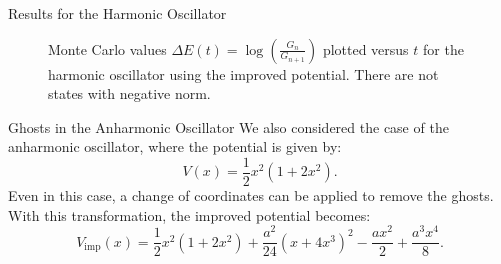 \documentclass{beamer}
\begin{document}
\begin{frame}{Results for the Harmonic Oscillator}
\begin{figure}[ht]
\begin{minipage}[b]{0.4\linewidth}
            \caption{Monte Carlo values $\Delta E(t) = \log\left( \frac{G_n}{G_{n+1}} \right)$ plotted versus $t$ for the harmonic oscillator using the improved potential. There are not states with negative norm.}
            \label{fig:harmonic_oscillator_with_no_ghosts}
        \end{minipage}
    \end{figure}
\end{frame}

\begin{frame}{Ghosts in the Anharmonic Oscillator}
    We also considered the case of the anharmonic oscillator, where the potential is given by:
    \begin{equation*}
        V(x) = \frac{1}{2}x^2(1+2x^2).
    \end{equation*}
    Even in this case, a change of coordinates can be applied to remove the ghosts. With this transformation, the improved potential becomes:
    \begin{equation*}
        V_{\text{imp}}(x) = \frac{1}{2}x^2(1+2x^2) + \frac{a^2}{24} \left(x + 4x^3\right)^2 - \frac{ax^2}{2} + \frac{a^3x^4}{8}.
    \end{equation*}
\end{frame}
\end{document}
